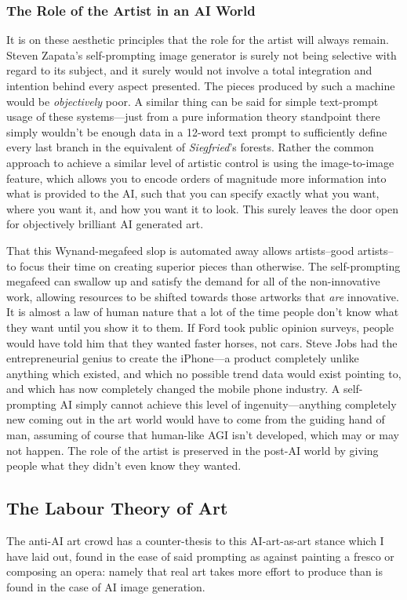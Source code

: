 \documentclass[11pt]{article}
\begin{document}
\subsubsection*{The Role of the Artist in an AI World}
\label{sec:orgd44679a}
It is on these aesthetic principles that the role for the artist will always remain. Steven Zapata's self-prompting image generator is surely not being selective with regard to its subject, and it surely would not involve a total integration and intention behind every aspect presented. The pieces produced by such a machine would be \emph{objectively} poor. A similar thing can be said for simple text-prompt usage of these systems---just from a pure information theory standpoint there simply wouldn't be enough data in a 12-word text prompt to sufficiently define every last branch in the equivalent of \emph{Siegfried}'s forests. Rather the common approach to achieve a similar level of artistic control is using the image-to-image feature, which allows you to encode orders of magnitude more information into what is provided to the AI, such that you can specify exactly what you want, where you want it, and how you want it to look. This surely leaves the door open for objectively brilliant AI generated art.

That this Wynand-megafeed slop is automated away allows artists--good artists--to focus their time on creating superior pieces than otherwise. The self-prompting megafeed can swallow up and satisfy the demand for all of the non-innovative work, allowing resources to be shifted towards those artworks that \emph{are} innovative. It is almost a law of human nature that a lot of the time people don't know what they want until you show it to them. If Ford took public opinion surveys, people would have told him that they wanted faster horses, not cars. Steve Jobs had the entrepreneurial genius to create the iPhone---a product completely unlike anything which existed, and which no possible trend data would exist pointing to, and which has now completely changed the mobile phone industry. A self-prompting AI simply cannot achieve this level of ingenuity---anything completely new coming out in the art world would have to come from the guiding hand of man, assuming of course that human-like AGI isn't developed, which may or may not happen. The role of the artist is preserved in the post-AI world by giving people what they didn't even know they wanted.

\subsection*{The Labour Theory of Art}
\label{sec:orgaaa1bef}
The anti-AI art crowd has a counter-thesis to this AI-art-as-art stance which I have laid out, found in the ease of said prompting as against painting a fresco or composing an opera: namely that real art takes more effort to produce than is found in the case of AI image generation.
\end{document}

